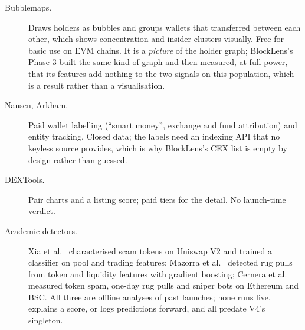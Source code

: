 \begin{description}
  \item[Bubblemaps.] Draws holders as bubbles and groups wallets that transferred between each other, which shows concentration and insider clusters visually. Free for basic use on EVM chains. It is a \emph{picture} of the holder graph; BlockLens's Phase 3 built the same kind of graph and then measured, at full power, that its features add nothing to the two signals on this population, which is a result rather than a visualisation.
  \item[Nansen, Arkham.] Paid wallet labelling (``smart money'', exchange and fund attribution) and entity tracking. Closed data; the labels need an indexing API that no keyless source provides, which is why BlockLens's CEX list is empty by design rather than guessed.
  \item[DEXTools.] Pair charts and a listing score; paid tiers for the detail. No launch-time verdict.
  \item[Academic detectors.] Xia et al.~\cite{xia2021} characterised scam tokens on Uniswap V2 and trained a classifier on pool and trading features; Mazorra et al.~\cite{mazorra2022} detected rug pulls from token and liquidity features with gradient boosting; Cernera et al.~\cite{cernera2023} measured token spam, one-day rug pulls and sniper bots on Ethereum and BSC. All three are offline analyses of past launches; none runs live, explains a score, or logs predictions forward, and all predate V4's singleton.
\end{description}

